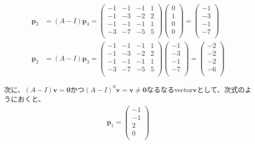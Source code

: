 \documentclass[dvipdfmx]{jsarticle}
\begin{document}
\begin{align*}
\mathbf{p}_{3} &= (A - I)\mathbf{p}_{4} = \begin{pmatrix}
 - 1 & - 1 & - 1 & 1 \\
 - 1 & - 3 & - 2 & 2 \\
 - 1 & - 1 & - 1 & 1 \\
 - 3 & - 7 & - 5 & 5 \\
\end{pmatrix}\begin{pmatrix}
0 \\
1 \\
0 \\
0 \\
\end{pmatrix} = \begin{pmatrix}
 - 1 \\
 - 3 \\
 - 1 \\
 - 7 \\
\end{pmatrix}\\
\mathbf{p}_{2} &= (A - I)\mathbf{p}_{3} = \begin{pmatrix}
 - 1 & - 1 & - 1 & 1 \\
 - 1 & - 3 & - 2 & 2 \\
 - 1 & - 1 & - 1 & 1 \\
 - 3 & - 7 & - 5 & 5 \\
\end{pmatrix}\begin{pmatrix}
 - 1 \\
 - 3 \\
 - 1 \\
 - 7 \\
\end{pmatrix} = \begin{pmatrix}
 - 2 \\
 - 2 \\
 - 2 \\
 - 6 \\
\end{pmatrix}
\end{align*}\par
次に、$(A - I)\mathbf{v} = \mathbf{0}$かつ$(A - I)^{0}\mathbf{v} = \mathbf{v} \neq \mathbf{0}$なるなるvector$\mathbf{v}$として、次式のようにおくと、
\begin{align*}
\mathbf{p}_{1} = \begin{pmatrix}
 - 1 \\
 - 1 \\
2 \\
0 \\
\end{pmatrix}
\end{align*}
\end{document}
